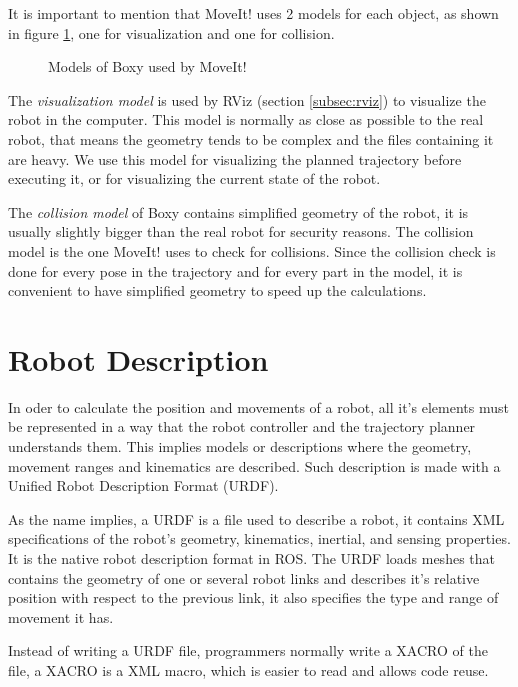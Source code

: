 It is important to mention that MoveIt! uses 2 models for each object, as shown in figure \ref{fig:models}, one for visualization and one for collision. 
\begin{figure}[H]
	\centering
	\begin{subfigure}[][Visualization Model]
		{\texttt{[image: boxy/visual.png]}}
	\end{subfigure}
	\begin{subfigure}[][Collision Model]
		{\texttt{[image: boxy/collision.png]}}
	\end{subfigure}
	\vspace{-15pt}
	\caption{Models of Boxy used by MoveIt!}
	\vspace{-10pt}
	\label{fig:models}
\end{figure}

The \textit{visualization model} is used by RViz (section \ref{subsec:rviz}) to visualize the robot in the computer. This model is normally as close as possible to the real robot, that means the geometry tends to be complex and the files containing it are heavy. We use this model for visualizing the planned trajectory before executing it, or for visualizing the current state of the robot.

The \textit{collision model} of Boxy contains simplified geometry of the robot, it is usually slightly bigger than the real robot for security reasons. The collision model is the one MoveIt! uses to check for collisions. Since the collision check is done for every pose in the trajectory and for every part in the model, it is convenient to have simplified geometry to speed up the calculations. 

\section{Robot Description}
\label{sec:urdf}

In oder to calculate the position and movements of a robot, all it's elements must be  represented in a way that the robot controller and the trajectory planner understands them. This implies models or descriptions where the geometry, movement ranges and kinematics are described. Such description is made with a Unified Robot Description Format (URDF).

As the name implies, a URDF is a file used to describe a robot, it contains XML specifications of the robot's geometry, kinematics, inertial, and sensing properties. It is the native robot description format in ROS. The URDF loads meshes that contains the geometry of one or several robot links and describes it's relative position with respect to the previous link, it also specifies the type and range of movement it has.

Instead of writing a URDF file, programmers normally write a XACRO of the file, a XACRO is a XML macro, which is easier to read and allows code reuse. 